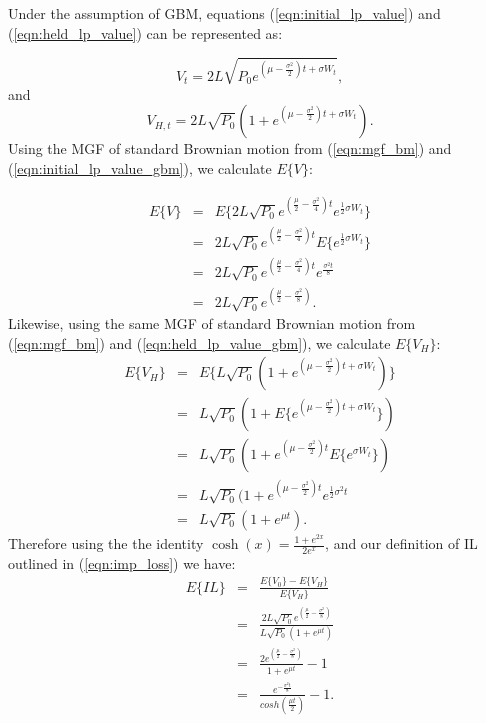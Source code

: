 \documentclass[journal,twocolumn,12pt]{ieeesyscoin}
\begin{document}
Under the assumption of GBM, equations (\ref{eqn:initial_lp_value}) and (\ref{eqn:held_lp_value}) can be represented as:

\begin{equation}\label{eqn:initial_lp_value_gbm}
V_{t} = 2L\sqrt{P_{0} e^{(\mu - \frac{\sigma^2}{2})t + \sigma W_{t} } },
\end{equation}
and  
\begin{equation}\label{eqn:held_lp_value_gbm}
V_{H,t} = 2L\sqrt{P_{0}} ( 1 + e^{(\mu - \frac{\sigma^2}{2})t + \sigma W_{t} } ).
\end{equation}
Using the MGF of standard Brownian motion from (\ref{eqn:mgf_bm}) and (\ref{eqn:initial_lp_value_gbm}), we calculate $E\{V\}$:

\begin{eqnarray*}\label{eqn:derivation_exp_v0}
E\{V\} &=& E\{2L \sqrt{P_{0}} e^{(\frac{\mu}{2} - \frac{\sigma^2}{4})t } e^{   \frac{1}{2}\sigma W_{t} } \} \\ 
           &=& 2L \sqrt{P_{0}} e^{(\frac{\mu}{2} - \frac{\sigma^2}{4})t } E\{e^{ \frac{1}{2}\sigma W_{t} }\} \\
           &=& 2L \sqrt{P_{0}} e^{(\frac{\mu}{2} - \frac{\sigma^2}{4})t } e^{\frac{\sigma^2 t}{8}} \\
           &=&  2L \sqrt{P_{0}}e^{( \frac{\mu}{2} - \frac{\sigma^2}{8})}.
\end{eqnarray*}
Likewise, using the same MGF of standard Brownian motion from (\ref{eqn:mgf_bm}) and (\ref{eqn:held_lp_value_gbm}), we calculate $E\{V_{H}\}$: 
\begin{eqnarray*}\label{eqn:derivation_exp_vH}
E\{V_{H}\} &=& E\{L \sqrt{P_{0}}(1 + e^{(\mu - \frac{\sigma^2}{2})t + \sigma W_{t} })\} \\
		   &=& L \sqrt{P_{0}}(1 + E\{ e^{(\mu - \frac{\sigma^2}{2})t + \sigma W_{t} }  \}) \\
		   &=& L \sqrt{P_{0}}(1 + e^{(\mu - \frac{\sigma^2}{2})t} E\{e^{\sigma W_{t}}\} ) \\
		   &=& L \sqrt{P_{0}}(1 + e^{(\mu - \frac{\sigma^2}{2})t} e^{\frac{1}{2} \sigma^2 t} \\
		   &=& L \sqrt{P_{0}}(1 + e^{\mu t} ).
\end{eqnarray*}
Therefore using the the identity $\cosh(x) = \frac{1 + e^{2x}}{2 e^x}$, and our definition of IL outlined in (\ref{eqn:imp_loss})  we have:
\begin{eqnarray*}\label{eqn:derivation_exp_IL}
E\{IL\} &=& \frac{E\{V_{0}\} - E\{V_{H}\}}{E\{V_{H}\}} \\
		&=& \frac{2L \sqrt{P_{0}}e^{( \frac{\mu}{2} - \frac{\sigma^2}{8})} }{L \sqrt{P_{0}}(1 + e^{\mu t} )}\\
		&=& \frac{2e^{( \frac{\mu}{2} - \frac{\sigma^2}{8})}}{1 + e^{\mu t}} - 1\\
		&=& \frac{e^{-\frac{\sigma^2 t}{8}}}{ cosh(\frac{\mu t}{2})} - 1.
\end{eqnarray*}
\end{document}
